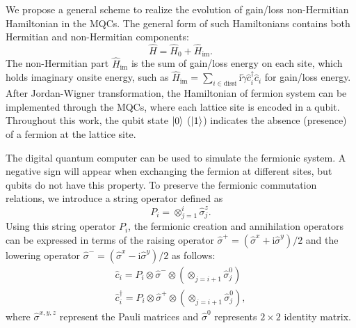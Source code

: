 \documentclass[longbibliography, aps, prx, amsmath, amssymb, amsfonts, twocolumn,superscriptaddress, footinbib]{revtex4-1}
\begin{document}
	We propose a general scheme to realize the evolution of gain/loss non-Hermitian Hamiltonian in the MQCs.
	The general form of such Hamiltonians contains both Hermitian and non-Hermitian components:
	\begin{equation}
		\hat{H} = \hat{H}_0 +\hat{H}_{\text{im}}. \label{eq:non-hermitian}
	\end{equation}
	The non-Hermitian part $\hat{H}_{\text{im}}$ is the sum of gain/loss energy on each site, which holds imaginary onsite energy, such as $\hat{H}_{\text{im}} = \sum_{i\in \text{dissi}} \mathrm{i}\tilde{\gamma} \hat{c}_i^{\dagger} \hat{c}_i$ for gain/loss energy. 
	After Jordan-Wigner transformation, the Hamiltonian of fermion system can be implemented through the MQCs, where each lattice site is encoded in a qubit. 
	Throughout this work, the qubit state $\ket{0}$ ($\ket{1}$) indicates the absence (presence) of a fermion at the lattice site.


	The digital quantum computer can be used to simulate the fermionic system. 
	A negative sign will appear when exchanging the fermion at different sites, but qubits do not have this property. 
	To preserve the fermionic commutation relations, we introduce a string operator defined as
	\begin{equation}
		P_i = \otimes_{j=1}^i\hat{\sigma}^z_j.
	\end{equation}
	Using this string operator $P_i$, the fermionic creation and annihilation operators can be expressed in terms of the raising operator $\hat{\sigma}^+=(\hat{\sigma}^x+\mathrm{i}\hat{\sigma}^y)/2$ and the lowering operator $\hat{\sigma}^-=(\hat{\sigma}^x-\mathrm{i}\hat{\sigma}^y)/2$ as follows:
	\begin{equation}
		\begin{split}
			\hat{c}_i = P_i \otimes \hat{\sigma}^{-}\otimes (\otimes_{j=i+1}\hat{\sigma}^0_j)\\
			\hat{c}_i^{\dagger} = P_i \otimes \hat{\sigma}^{+}\otimes (\otimes_{j=i+1}\hat{\sigma}^0_j),
		\end{split}
	\end{equation}
	where $\hat{\sigma}^{x,y,z}$ represent the Pauli matrices and $\hat{\sigma}^0$ represents $2\times 2$ identity matrix. 
	
\end{document}
